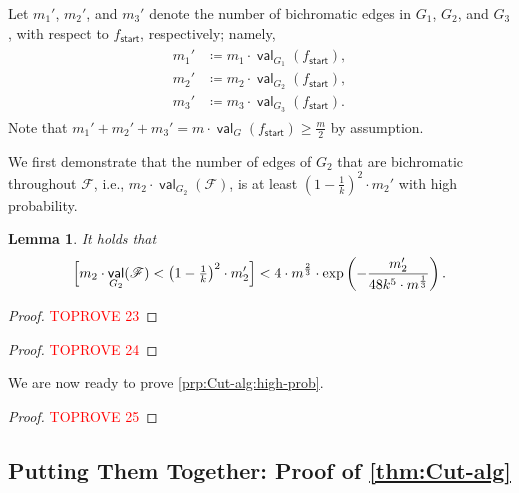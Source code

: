 \documentclass[11pt,fleqn]{article}
\renewcommand{\geq}{\geqslant}
\newcommand{\defeq}{\coloneq}
\DeclareMathOperator{\val}{\mathsf{val}}
\newcommand{\sss}{\mathsf{start}}
\newcommand{\f}{f}
\newcommand{\sqcol}{\scrF}
\newcommand{\scrF}{\mathscr{F}}
\let\Pr\relax\DeclareMathOperator*{\Pr}{\mathbb{P}}
\newtheorem{lemma}[theorem]{Lemma}
\theoremstyle{definition}
\numberwithin{equation}{section}
\begin{document}
Let $m_1'$, $m_2'$, and $m_3'$ denote 
the number of bichromatic edges in $G_1$, $G_2$, and $G_3$,
with respect to $\f_\sss$, respectively; namely,
\begin{align}
\begin{aligned}
    m_1' & \defeq m_1 \cdot \val_{G_1}(\f_\sss), \\
    m_2' & \defeq m_2 \cdot \val_{G_2}(\f_\sss), \\
    m_3' & \defeq m_3 \cdot \val_{G_3}(\f_\sss).
\end{aligned}
\end{align}
Note that $m_1'+m_2'+m_3' = m \cdot \val_G(\f_\sss) \geq \frac{m}{2}$ by assumption.

We first demonstrate that
the number of edges of $G_2$ that are bichromatic throughout $\sqcol$,
i.e., $m_2 \cdot \val_{G_2}(\sqcol)$,
is at least $\left(1-\frac{1}{k}\right)^2 \cdot m_2'$
with high probability.




\begin{lemma}
\label{lem:Cut-alg:high-degree}
It holds that
\begin{align}
    \Pr\Bigl[
        m_2 \cdot \val_{G_2}(\sqcol)
        < \left(1-\tfrac{1}{k}\right)^2 \cdot m_2'
    \Bigr]
    < 4 \cdot m^{\frac{2}{3}} \cdot \exp\left(
        -\frac{m_2'}{48 k^5 \cdot m^\frac{1}{3}}
    \right).
\end{align}
\end{lemma}
\begin{proof}\textcolor{red}{TOPROVE 23}\end{proof}



\begin{proof}\textcolor{red}{TOPROVE 24}\end{proof}





We are now ready to prove \cref{prp:Cut-alg:high-prob}.
\begin{proof}\textcolor{red}{TOPROVE 25}\end{proof}

















\subsection{Putting Them Together: Proof of \texorpdfstring{\cref{thm:Cut-alg}}{Theorem~\protect\ref{thm:Cut-alg}}}
\end{document}
